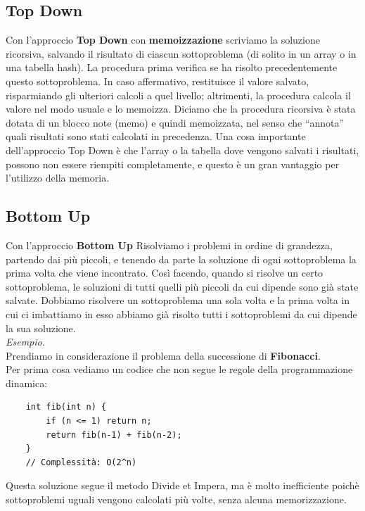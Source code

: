 \subsection{Top  Down}
Con l'approccio \textbf{Top Down} con \textbf{memoizzazione} scriviamo la soluzione ricorsiva, 
salvando il risultato di ciascun sottoproblema (di solito in un array o in una tabella hash). 
La procedura prima verifica se ha risolto precedentemente questo sottoproblema. 
In caso affermativo, restituisce il valore salvato, risparmiando gli ulteriori calcoli a quel livello; 
altrimenti, la procedura calcola il valore nel modo usuale e lo memoizza. 
Diciamo che la procedura ricorsiva è stata dotata di un blocco note (memo) e quindi memoizzata, 
nel senso che “annota” quali risultati sono stati calcolati in precedenza. 
Una cosa importante dell'approccio Top Down è che l'array o la tabella dove vengono salvati i risultati, 
possono non essere riempiti completamente, e questo è un gran vantaggio per l'utilizzo della memoria. 
 

\subsection{Bottom Up}
Con l'approccio \textbf{Bottom Up} Risolviamo i problemi in ordine di grandezza, partendo dai più piccoli, e tenendo da parte la soluzione di ogni sottoproblema la prima volta che viene incontrato. Così facendo, quando si risolve un certo sottoproblema, le soluzioni di tutti quelli più piccoli da cui dipende sono già state salvate. Dobbiamo risolvere un sottoproblema una sola volta e la prima volta in cui ci imbattiamo in esso abbiamo già risolto tutti i sottoproblemi da cui dipende la sua soluzione.\bigskip\\


\noindent \textit{Esempio.}\\
Prendiamo in considerazione il problema della successione di \textbf{Fibonacci}.\\
Per prima cosa vediamo un codice che non segue le regole della programmazione dinamica:
\begin{verbatim}
    int fib(int n) {
        if (n <= 1) return n;
        return fib(n-1) + fib(n-2);
    }
    // Complessità: O(2^n)
\end{verbatim}
Questa soluzione segue il metodo Divide et Impera, ma è molto inefficiente poichè sottoproblemi uguali vengono calcolati più volte, senza alcuna memorizzazione.\medskip\\


